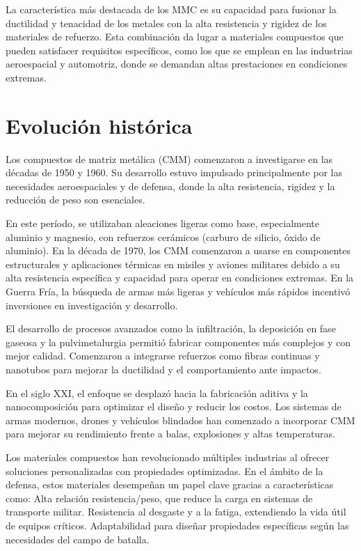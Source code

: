 \documentclass[letterpaper, 12pt]{article}
\begin{document}
La característica más destacada de los MMC es su capacidad para fusionar la
ductilidad y tenacidad de los metales con la alta resistencia y rigidez de los
materiales de refuerzo. Esta combinación da lugar a materiales compuestos que
pueden satisfacer requisitos específicos, como los que se emplean en las
industrias aeroespacial y automotriz, donde se demandan altas prestaciones en
condiciones extremas.

\section{Evolución histórica}

Los compuestos de matriz metálica (CMM) comenzaron a investigarse en las
décadas de 1950 y 1960. Su desarrollo estuvo impulsado principalmente por las
necesidades aeroespaciales y de defensa, donde la alta resistencia, rigidez y
la reducción de peso son esenciales.

En este período, se utilizaban aleaciones ligeras como base, especialmente
aluminio y magnesio, con refuerzos cerámicos (carburo de silicio, óxido de
aluminio). En la década de 1970, los CMM comenzaron a usarse en componentes
estructurales y aplicaciones térmicas en misiles y aviones militares debido a
su alta resistencia específica y capacidad para operar en condiciones extremas.
En la Guerra Fría, la búsqueda de armas más ligeras y vehículos más rápidos
incentivó inversiones en investigación y desarrollo.

El desarrollo de procesos avanzados como la infiltración, la deposición en fase
gaseosa y la pulvimetalurgia permitió fabricar componentes más complejos y con
mejor calidad. Comenzaron a integrarse refuerzos como fibras continuas y
nanotubos para mejorar la ductilidad y el comportamiento ante impactos.

En el siglo XXI, el enfoque se desplazó hacia la fabricación aditiva y la
nanocomposición para optimizar el diseño y reducir los costos. Los sistemas de
armas modernos, drones y vehículos blindados han comenzado a incorporar CMM
para mejorar su rendimiento frente a balas, explosiones y altas temperaturas.

Los materiales compuestos han revolucionado múltiples industrias al ofrecer
soluciones personalizadas con propiedades optimizadas. En el ámbito de la
defensa, estos materiales desempeñan un papel clave gracias a características
como: Alta relación resistencia/peso, que reduce la carga en sistemas de
transporte militar. Resistencia al desgaste y a la fatiga, extendiendo la vida
útil de equipos críticos. Adaptabilidad para diseñar propiedades específicas
según las necesidades del campo de batalla.
\end{document}
